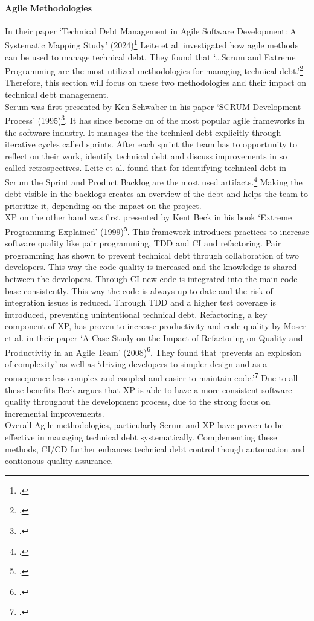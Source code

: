 \paragraph{Agile Methodologies}
In their paper `Technical Debt Management in Agile Software Development: A Systematic Mapping Study' (2024)\footcite{leiteTechnicalDebtManagement2024} Leite et al.
investigated how agile methods can be used to manage technical debt. They found that `\ldots Scrum and Extreme Programming are the most utilized methodologies 
for managing technical debt.'\footcite[318]{leiteTechnicalDebtManagement2024} Therefore, this section will focus on these two methodologies and their impact on technical debt management.\\
Scrum was first presented by Ken Schwaber in his paper `SCRUM Development Process' (1995)\footcite{schwaberSCRUMDevelopmentProcess1997}. 
It has since become on of the most popular agile frameworks in the software industry. It manages the the technical debt explicitly through
iterative cycles called sprints. After each sprint the team has to opportunity to reflect on their work, identify technical debt and discuss improvements in so called
retrospectives. Leite et al. found that for identifying technical debt in Scrum the Sprint and Product Backlog are the most used artifacts.\footcite[315]{leiteTechnicalDebtManagement2024}
Making the debt visible in the backlogs creates an overview of the debt and helps the team to prioritize it, depending on the impact on the project.\\
\ac{XP} on the other hand was first presented by Kent Beck in his book `Extreme Programming Explained' (1999)\footcite{beckExtremeProgrammingExplained1999}.
This framework introduces practices to increase software quality like pair programming, \ac{TDD} and \ac{CI} and refactoring.
Pair programming has shown to prevent technical debt through collaboration of two developers. This way the code quality is increased and the knowledge is shared between the developers.
Through \ac{CI} new code is integrated into the main code base consistently. This way the code is always up to date and the risk of integration issues is reduced. 
Through \ac{TDD} and a higher test coverage is introduced, preventing unintentional technical debt.
Refactoring, a key component of XP, has proven to increase productivity and code quality by Moser et al. in their paper 
`A Case Study on the Impact of Refactoring on Quality and Productivity in an Agile Team' (2008)\footcite{moserCaseStudyImpact2008}.
They found that `prevents an explosion of complexity' as well as `driving developers to simpler design and as a consequence less complex and coupled and easier to maintain code.'\footcite[262]{moserCaseStudyImpact2008}
Due to all these benefits Beck argues that \ac{XP} is able to have a more consistent software quality throughout the development process, due to the strong focus on incremental improvements.\\
Overall Agile methodologies, particularly Scrum and \ac{XP} have proven to be effective in managing technical debt systematically.
Complementing these methods, \ac{CI/CD} further enhances technical debt control though automation and contionous quality assurance.\\

